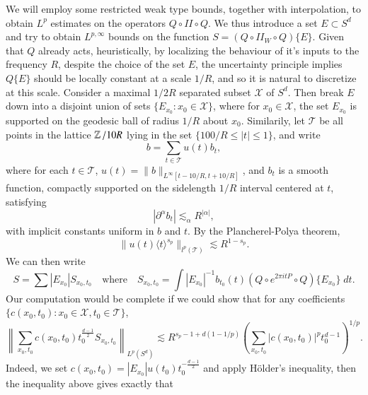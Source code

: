 We will employ some restricted weak type bounds, together with interpolation, to obtain $L^p$ estimates on the operators $Q \circ II \circ Q$. We thus introduce a set $E \subset S^d$ and try to obtain $L^{p,\infty}$ bounds on the function $S = (Q \circ II_W \circ Q) \{ E \}$. Given that $Q$ already acts, heuristically, by localizing the behaviour of it's inputs to the frequency $R$, despite the choice of the set $E$, the uncertainty principle implies $Q \{ E \}$ should be locally constant at a scale $1/R$, and so it is natural to discretize at this scale. Consider a maximal $1/2R$ separated subset $\mathcal{X}$ of $S^d$. Then break $E$ down into a disjoint union of sets $\{ E_{x_0}: x_0 \in \mathcal{X} \}$, where for $x_0 \in \mathcal{X}$, the set $E_{x_0}$ is supported on the geodesic ball of radius $1/R$ about $x_0$. Similarily, let $\mathcal{T}$ be all points in the lattice $\operatorname{\mathbb{Z}} / 10 R$ lying in the set $\{ 100/R \leq |t| \leq 1 \}$, and write
%
\[ b = \sum_{t \in \mathcal{T}} u(t) b_t, \]
%
where for each $t \in \mathcal{T}$, $u(t) = \| b \|_{L^\infty[t - 10/R, t + 10/R]}$, and $b_t$ is a smooth function, compactly supported on the sidelength $1/R$ interval centered at $t$, satisfying
%
\[ |\partial^\alpha b_t| \lesssim_\alpha R^{|\alpha|}, \]
%
with implicit constants uniform in $b$ and $t$. By the Plancherel-Polya theorem, 
%
\[ \| u(t) \langle t \rangle^{s_p} \|_{l^p(\mathcal{T})} \lesssim R^{1 - s_p}. \]
%
%
%
We can then write
%
\[ S = \sum |E_{x_0}| {S\!}_{x_0,t_0} \quad\text{where}\quad {S\!}_{x_0,t_0} = \int |E_{x_0}|^{-1} b_{t_0}(t) (Q \circ e^{2 \pi i t P} \circ Q) \{ E_{x_0} \}\; dt. \]
%
%
%
Our computation would be complete if we could show that for any coefficients $\{ c(x_0,t_0) : x_0 \in \mathcal{X}, t_0 \in \mathcal{T} \}$,
%
\[ \left\| \sum_{x_0,t_0} c(x_0,t_0) t_0^{\frac{d-1}{2}} {S\!}_{x_0,t_0} \right\|_{L^p(S^d)} \lesssim R^{s_p - 1 + d(1 - 1/p)} \left( \sum_{x_0,t_0} |c(x_0,t_0)|^p t_0^{d-1} \right)^{1/p}. \]
%
Indeed, we set $c(x_0,t_0) = |E_{x_0}| u(t_0) t_0^{- \frac{d-1}{2}}$ and apply H\"{o}lder's inequality, then the inequality above gives exactly that
